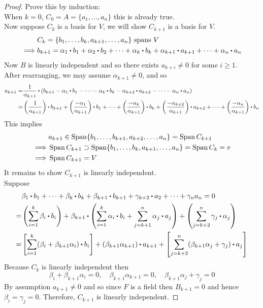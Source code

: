 \documentclass[../Main.tex]{subfiles}
\begin{document}
\begin{proof}
	Prove this by induction:\\
	When $k=0$, $C_0=A=\{a_1,\dots,a_n\}$ this is already true.\\
	Now suppose $C_k$ is a basis for $V$, we will show $C_{k+1}$ is a basis for $V$.
	\begin{align*}
	&C_k = \{b_1,\dots,b_k,a_{k+1},\dots,a_n\} \text{ spans } V\\
	\implies &b_{k+1}=\alpha_1\rdot b_1+\alpha_2\rdot b_2+\dots+\alpha_k\rdot b_k+\alpha_{k+1}\rdot a_{k+1}+\dots+\alpha_n\rdot a_n
	\end{align*}
	Now $B$ is linearly independent and so there exists $a_{k+i} \ne 0$ for some $i\ge 1$.\\
	After rearranging, we may assume $\alpha_{k+1}\ne 0$, and so
	\begin{align*}
	a_{k+1} =& \frac{1}{\alpha_{k+1}}\rdot \left(b_{k+1}-\alpha_1\rdot b_1-\dots-\alpha_k\rdot b_k-\alpha_{k+2}\rdot a_{k+2}-\dots-\alpha_n\rdot a_n\right)\\
	=&\left(\frac{1}{\alpha_{k+1}}\right)\rdot b_{k+1}+\left(\frac{-\alpha_1}{\alpha_{k+1}}\right)\rdot b_1+\dots+\left(\frac{-\alpha_k}{\alpha_{k+1}}\right)\rdot b_k+\left(\frac{-\alpha_{k+2}}{\alpha_{k+1}}\right)\rdot a_{k+2}+\dots+\left(\frac{-\alpha_n}{\alpha_{k+1}}\right)\rdot b_n
	\end{align*}
	This implies 
	\begin{align*}
	&a_{k+1}\in \operatorname{Span}\{b_1,\dots,b_{k+1},a_{k+2},\dots,a_n\}=\operatorname{Span} C_{k+1}\\
	\implies & \operatorname{Span} C_{k+1}\supset \operatorname{Span}\{b_1,\dots,b_k,a_{k+1},\dots,a_n\} = \operatorname{Span} C_k = v\\
	\implies & \operatorname{Span} C_{k+1}=V
	\end{align*}
	It remains to show $C_{k+1}$ is linearly independent.\\
	Suppose 
	\begin{align*}
	&\beta_1\rdot b_1+\dots+\beta_k\rdot b_k+\beta_{k+1}\rdot b_{k+1}+\gamma_{k+2}\rdot a_2 +\dots+\gamma_na_n=0\\
	=& \left(\sum_{i=1}^k\beta_i\rdot b_i\right) + \beta_{k+1}\rdot \left(\sum_{i=1}^k\alpha_i\rdot b_i+\sum_{j=k+1}^{n}\alpha_j\rdot a_j\right) +\left(\sum_{j=k+2}^n \gamma_j\rdot \alpha_j\right)\\
	=&\left[\sum_{i=1}^k(\beta_i+\beta_{k+1}\alpha_i)\rdot b_i\right] + (\beta_{k+1} \alpha_{k+1})\rdot a_{k+1}+\left[\sum_{j=k+2}^n(\beta_{k+1}\alpha_j+\gamma_j)\rdot a_j\right]
	\end{align*}
	Because $C_k$ is linearly independent then 
	\[\beta_i+\beta_{k+1}\alpha_i = 0,\quad \beta_{k+1} \alpha_{k+1}=0,\quad\beta_{k+1}\alpha_j+\gamma_j=0 \]
	By assumption $a_{k+1}\ne 0$ and so since $F$ is a field then $B_{k+1}=0$ and hence $\beta_i=\gamma_j=0$. Therefore, $C_{k+1}$ is linearly independent.
\end{proof}
\end{document}
